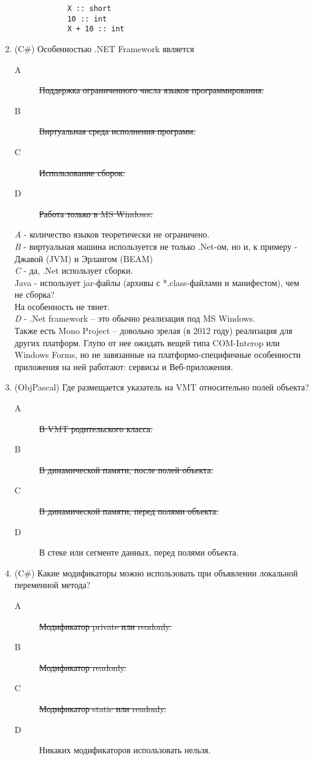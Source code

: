 \documentclass[12pt]{article}
\begin{document}
\begin{enumerate}
			\begin{verbatim}
			X :: short
			10 :: int
			X + 10 :: int
			\end{verbatim}


		\item (C\#)  Особенностью .NET Framework является
			\begin{description}
				\item[A] \sout{Поддержка ограниченного числа языков программирования.}
				\item[B] \sout{Виртуальная среда исполнения программ.}
				\item[C] \sout{Использование сборок.}
				\item[D] \sout{Работа только в MS Windows.}
			\end{description}

			\emph{A} - количество языков теоретически не ограничено.
			\\
			\emph{B} - виртуальная машина используется не только .Net-ом, но и, к примеру - Джавой (JVM) и Эрлангом (BEAM)
			\\
			\emph{C} - 
				да, .Net использует сборки. \\
				Java - использует jar-файлы (архивы с *.class-файлами и манифестом), чем не сборка? \\
				На особенность не тянет.
			\\
			\emph{D} - .Net framework -- это обычно реализация под MS Windows. \\
				Также есть Mono Project -- довольно зрелая (в 2012 году) реализация для других платформ. Глупо от нее ожидать вещей типа COM-Interop или Windows Forms, но не завязанные на платформо-специфичные особенности приложения на ней работают: сервисы и Веб-приложения.

		\item (ObjPascal) Где размещается указатель на VMT относительно полей объекта? 
			\begin{description}
				\item[A] \sout{В VMT родительского класса.}
				\item[B] \sout{В динамической памяти, после полей объекта.}
				\item[C] \sout{В динамической памяти, перед полями объекта.}
				\item[D] В стеке или сегменте данных, перед полями объекта.
			\end{description}

		\item (C\#)  Какие модификаторы можно использовать при объявлении локальной переменной метода? 
			\begin{description}
				\item[A] \sout{Модификатор private или readonly.}
				\item[B] \sout{Модификатор readonly.}
				\item[C] \sout{Модификатор static или readonly.}
				\item[D] Никаких модификаторов использовать нельзя.
			\end{description}


\end{enumerate}
\end{document}
